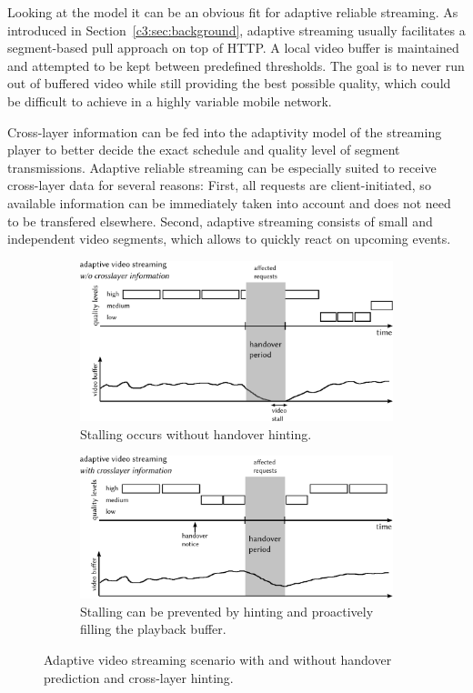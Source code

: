 Looking at the model it can be an obvious fit for adaptive reliable streaming. As introduced in Section~\ref{c3:sec:background}, adaptive streaming usually facilitates a segment-based pull approach on top of \gls{HTTP}. A local video buffer is maintained and attempted to be kept between predefined thresholds. The goal is to never run out of buffered video while still providing the best possible quality, which could be difficult to achieve in a highly variable mobile network.

Cross-layer information can be fed into the adaptivity model of the streaming player to better decide the exact schedule and quality level of segment transmissions. Adaptive reliable streaming can be especially suited to receive cross-layer data for several reasons: First, all requests are client-initiated, so available information can be immediately taken into account and does not need to be transfered elsewhere. Second, adaptive streaming consists of small and independent video segments, which allows to quickly react on upcoming events.

\begin{figure}[htb]
	\centering
	\begin{subfigure}[b]{0.80\textwidth}
		\includegraphics[width=\textwidth]{images/adaptive-streaming-no-cl.pdf}
		\caption{Stalling occurs without handover hinting.}
		\label{c5:fig:streaming-hinting-no-cl}
	\end{subfigure}%

	\begin{subfigure}[b]{0.80\textwidth}
		\includegraphics[width=\textwidth]{images/adaptive-streaming-cl.pdf}
		\caption{Stalling can be prevented by hinting and proactively filling the playback buffer.}
		\label{c5:fig:streaming-hinting-cl}
	\end{subfigure}%
	\caption{Adaptive video streaming scenario with and without handover prediction and cross-layer hinting.}
\label{c5:fig:streaming-hinting}
\end{figure}

